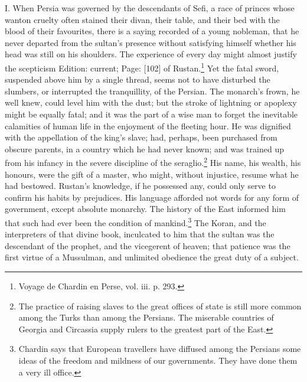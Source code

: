 I. When Persia was governed by the descendants of Sefi, a race of princes whose wanton cruelty often stained their divan, their table, and their bed with the blood of their favourites, there is a saying recorded of a young nobleman, that he never departed from the sultan\texthebrew{}’s presence without satisfying himself whether his head was still on his shoulders. The experience of every day might almost justify the scepticism Edition: current; Page: [102] of Rustan.\footnote{Voyage de Chardin en Perse, vol. iii. p. 293.} Yet the fatal sword, suspended above him by a single thread, seems not to have disturbed the slumbers, or interrupted the tranquillity, of the Persian. The monarch\texthebrew{}’s frown, he well knew, could level him with the dust; but the stroke of lightning or apoplexy might be equally fatal; and it was the part of a wise man to forget the inevitable calamities of human life in the enjoyment of the fleeting hour. He was dignified with the appellation of the king\texthebrew{}’s slave; had, perhaps, been purchased from obscure parents, in a country which he had never known; and was trained up from his infancy in the severe discipline of the seraglio.\footnote{The practice of raising slaves to the great offices of state is still more common among the Turks than among the Persians. The miserable countries of Georgia and Circassia supply rulers to the greatest part of the East.} His name, his wealth, his honours, were the gift of a master, who might, without injustice, resume what he had bestowed. Rustan\texthebrew{}’s knowledge, if he possessed any, could only serve to confirm his habits by prejudices. His language afforded not words for any form of government, except absolute monarchy. The history of the East informed him that such had ever been the condition of mankind.\footnote{Chardin says that European travellers have diffused among the Persians some ideas of the freedom and mildness of our governments. They have done them a very ill office.} The Koran, and the interpreters of that divine book, inculcated to him that the sultan was the descendant of the prophet, and the vicegerent of heaven; that patience was the first virtue of a Mussulman, and unlimited obedience the great duty of a subject.

